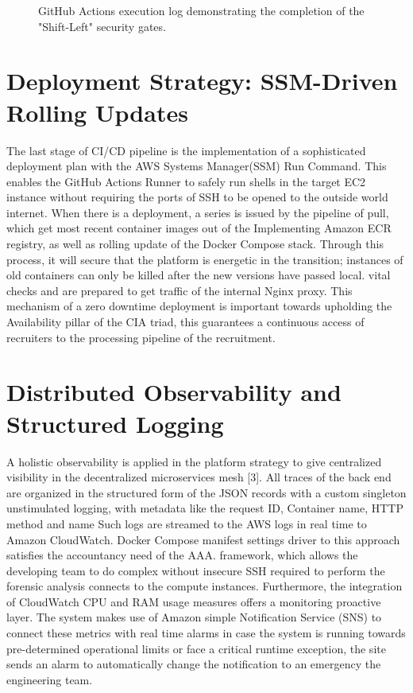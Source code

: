 \documentclass[conference]{IEEEtran}
\begin{document}
\begin{figure}[ht!]
\centering
{}
\caption{GitHub Actions execution log demonstrating the completion of the "Shift-Left" security gates.}
\label{fig:actions}
\end{figure}

\section{Deployment Strategy: SSM-Driven Rolling Updates}
The last stage of CI/CD pipeline is the implementation of a sophisticated deployment plan with the AWS Systems Manager(SSM) Run Command. This enables the GitHub Actions Runner to safely run shells in the target EC2 instance without requiring the ports of SSH to be opened to the outside world internet. When there is a deployment, a series is issued by the pipeline of pull, which get most recent container images out of the Implementing Amazon ECR registry, as well as rolling update of the Docker Compose stack. Through this process, it will secure that the platform is energetic in the transition; instances of old containers can only be killed after the new versions have passed local. vital checks and are prepared to get traffic of the internal Nginx proxy. This mechanism of a zero downtime deployment is important towards upholding the Availability pillar of the CIA triad, this guarantees a continuous access of recruiters to the processing pipeline of the recruitment.

\section{Distributed Observability and Structured Logging} 
A holistic observability is applied in the platform strategy to give centralized visibility in the decentralized microservices mesh [3]. All traces of the back end are organized in the structured form of the JSON records with a custom singleton unstimulated logging, with metadata like the request ID, Container name, HTTP method and name Such logs are streamed to the AWS logs in real time to Amazon CloudWatch. Docker Compose manifest settings driver to this approach satisfies the accountancy need of the AAA. framework, which allows the developing team to do complex without insecure SSH required to perform the forensic analysis connects to the compute instances. Furthermore, the integration of CloudWatch CPU and RAM usage measures offers a monitoring proactive layer. The system makes use of Amazon simple Notification Service (SNS) to connect these metrics with real time alarms in case the system is running towards pre-determined operational limits or face a critical runtime exception, the site sends an alarm to automatically change the notification to an emergency the engineering team.
\end{document}
